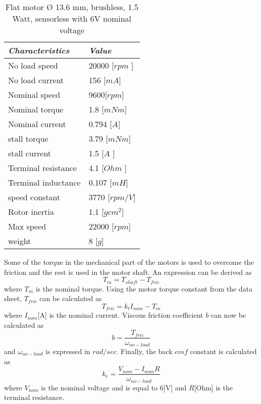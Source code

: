 \begin{table}[H]
	\centering
	\begin{tabular}{|l|l|}
		\hline
		\textit{\textbf{Characteristics}}  & \textit{\textbf{Value}}                     				\\ \hline
		No load speed                      & 20000 {[}$rpm$ {]}                      					\\ \hline
		No load current                    & 156 {[}$mA${]}                             				\\ \hline
		Nominal speed                     	& 9600{[}$rpm${]}                                         	\\ \hline
		Nominal torque                     		& 1.8 [$mNm$]                                    		\\ \hline
		Nominal current                  	      & 0.794 {[}$A${]}  	
		\\ \hline
		stall torque                  	      & 3.79 {[}$mNm${]}                               			\\ \hline
		stall current                   & 1.5 {[}$A$ {]}                                     		
		 \\ \hline
		Terminal resistance  & 4.1 {[}$Ohm$ {]}                            				
		\\ \hline
		Terminal inductance     & 0.107 {[}$mH${]}                           	  				
		\\ \hline
		speed constant             & 3770 {[}$rpm/V${]}   					    \\ \hline
		Rotor inertia & 1.1 {[}$gc m^{2}${]}                               	
		 \\ \hline
		 Max speed  & 22000 {[}$rpm${]}                               	
		 \\ \hline
		 weight  & 8 {[}$g${]}                               	
		 \\ \hline
	\end{tabular}
	\caption{Flat motor $Ø$ 13.6 mm, brushless, 1.5 Watt, sensorless with 6V nominal voltage}
	\label{table:forfor}
\end{table}
Some of the torque in the mechanical part of the motors is used to overcome the friction and the rest is used in the motor shaft. An expression can be derived as
 \begin{equation*}
 T_{m} = T_{shaft} - T_{fric}
 \end{equation*}
  where $T_{m}$ is the nominal torque. Using the motor torque constant from the data sheet, $T_{fric}$ can be calculated as 
 \begin{equation*}
 T_{fric}	= k_{t} I_{nom} - T_{m} 
 \end{equation*}    
where $I_{nom} $[A] is the nominal current. Viscous friction coefficient $b$ can now be calculated as
\begin{equation*}
	b	= \frac{T_{fric} }{\omega_{no-load}}
\end{equation*}
and $\omega_{no-load}$ is expressed in $rad/sec$. Finally, the back $emf$ constant is calculated as
\begin{equation*}
	k_{e}	= \frac{V_{nom} - I_{nom}R}{\omega_{no-load}}
\end{equation*}
where $V_{nom}$ is the nominal voltage and is equal to 6[V] and  $R$[Ohm] is the terminal resistance. 